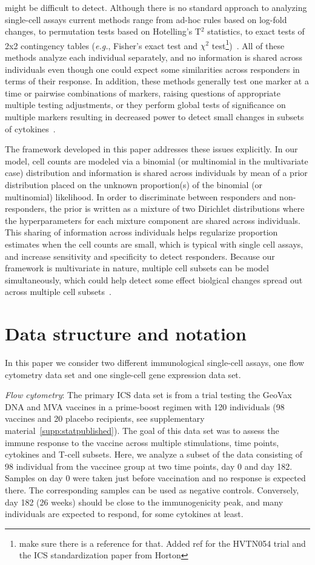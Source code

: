 \documentclass[11pt]{article}
\begin{document}
might be difficult to detect. Although there is no standard approach to analyzing single-cell assays current methods range from ad-hoc rules based on log-fold changes, to permutation tests based on Hotelling's T$^2$ statistics, to exact tests of 2x2 contingency tables (\textit{e.g.}, Fisher's exact test and $\chi^2$ test\footnote{make sure there is a reference for that. Added ref for the HVTN054 trial and the ICS standardization paper from Horton})~\cite{Trigona:2003,Sinclair:2004hs,Horton:2007tsa,Nason:2006dx,Peiperl:2010ej}. 
All of these methods analyze each individual separately, and no information is shared across individuals even though one could expect some similarities across responders in terms of their response. In addition, these methods generally test one marker at a time or pairwise combinations of markers, raising questions of appropriate multiple testing adjustments, or they perform global tests of significance on multiple markers resulting in decreased power to detect small changes in subsets of cytokines~\cite{Proschan:2009ks,Nason:2006dx}. 

The framework developed in this paper addresses these issues explicitly. In our model, cell counts are modeled via a binomial (or multinomial in the multivariate case) distribution and information is shared across individuals by mean of a prior distribution placed on the unknown proportion(s) of the binomial (or multinomial) likelihood. In order to discriminate between responders and non-responders, the prior is written as a mixture of two Dirichlet distributions where the hyperparameters for each mixture component are shared across individuals. This sharing of information across individuals helps regularize proportion estimates when the cell counts are small, which is typical with single cell assays, and increase sensitivity and specificity to detect responders. Because our framework is multivariate in nature, multiple cell subsets can be model simultaneously, which could help detect some effect biolgical changes spread out across multiple cell subsets~\cite{Nason:2006dx}.

\section{Data structure and notation} 
In this paper we consider two different immunological single-cell assays, one flow cytometry data set and one single-cell gene expression data set.

\textit{Flow cytometry}:
The primary ICS data set is from a  trial testing the GeoVax DNA and MVA vaccines in a prime-boost regimen with 120 individuals (98 vaccines and 20 placebo recipients, see supplementary material~\ref{supp:statpublished}). The goal of this data set was to assess the immune response to the vaccine across multiple stimulations, time points, cytokines and T-cell subsets. Here, we analyze a subset of the data consisting of 98 individual from the vaccinee group at two time points, day 0 and day 182. Samples on day 0 were taken just before vaccination and no response is expected there. The corresponding samples can be used as negative controls. Conversely, day 182 (26 weeks) should be close to the immunogenicity peak, and many individuals are expected to respond, for some cytokines at least. 
\end{document}
